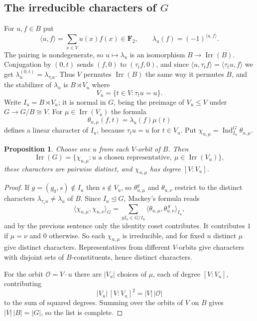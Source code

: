 \documentclass[11pt]{article}
\newtheorem{proposition}[theorem]{Proposition}
\theoremstyle{definition}
\theoremstyle{remark}
\newcommand{\F}{\mathbf F}
\newcommand{\Irr}{\operatorname{Irr}}
\newcommand{\Ind}{\operatorname{Ind}}
\begin{document}
\subsection{The irreducible characters of \texorpdfstring{$G$}{G}}

For $u,f\in B$ put
\[
 \langle u,f\rangle=\sum_{x\in V}u(x)f(x)\in\F_2,
 \qquad
 \lambda_u(f)=(-1)^{\langle u,f\rangle} .
\]
The pairing is nondegenerate, so $u\mapsto\lambda_u$ is an isomorphism
$B\to\Irr(B)$.  Conjugation by $(0,t)$ sends $(f,0)$ to $(\tau_tf,0)$,
and since $\langle u,\tau_tf\rangle=\langle\tau_tu,f\rangle$ we get
$\lambda_u^{(0,t)}=\lambda_{\tau_tu}$.  Thus $V$ permutes $\Irr(B)$ the
same way it permutes $B$, and the stabilizer of $\lambda_u$ is
$B\rtimes V_u$ where
\[
 V_u=\{t\in V:\tau_tu=u\} .
\]
Write $I_u=B\rtimes V_u$; it is normal in $G$, being the preimage of
$V_u\le V$ under $G\to G/B\cong V$.  For $\mu\in\Irr(V_u)$ the formula
\[
 \theta_{u,\mu}(f,t)=\lambda_u(f)\mu(t)
\]
defines a linear character of $I_u$, because $\tau_tu=u$ for $t\in
V_u$.  Put $\chi_{u,\mu}=\Ind_{I_u}^G\theta_{u,\mu}$.

\begin{proposition}\label{prop:all-irr}
Choose one $u$ from each $V$-orbit of $B$.  Then
\[
 \Irr(G)=\{\chi_{u,\mu}:u\text{ a chosen representative},\
 \mu\in\Irr(V_u)\},
\]
these characters are pairwise distinct, and $\chi_{u,\mu}$ has degree
$[V:V_u]$.
\end{proposition}

\begin{proof}
If $g=(g_0,s)\notin I_u$ then $s\notin V_u$, so
$\theta_{u,\mu}^g$ and $\theta_{u,\nu}$ restrict to the distinct
characters $\lambda_{\tau_su}\neq\lambda_u$ of $B$.  Since $I_u\trianglelefteq
G$, Mackey's formula reads
\[
 \langle\chi_{u,\mu},\chi_{u,\nu}\rangle_G
 =\sum_{gI_u\in G/I_u}
 \langle\theta_{u,\mu},\theta_{u,\nu}^{\,g}\rangle_{I_u},
\]
and by the previous sentence only the identity coset contributes.  It
contributes $1$ if $\mu=\nu$ and $0$ otherwise.  So each
$\chi_{u,\mu}$ is irreducible, and for fixed $u$ distinct $\mu$ give
distinct characters.  Representatives from different $V$-orbits give
characters with disjoint sets of $B$-constituents, hence distinct
characters.

For the orbit $\mathcal O=V\cdot u$ there are $|V_u|$ choices of $\mu$,
each of degree $[V:V_u]$, contributing
\[
 |V_u|\,[V:V_u]^2=|V|\,|\mathcal O|
\]
to the sum of squared degrees.  Summing over the orbits of $V$ on $B$
gives $|V|\,|B|=|G|$, so the list is complete.
\end{proof}
\end{document}
